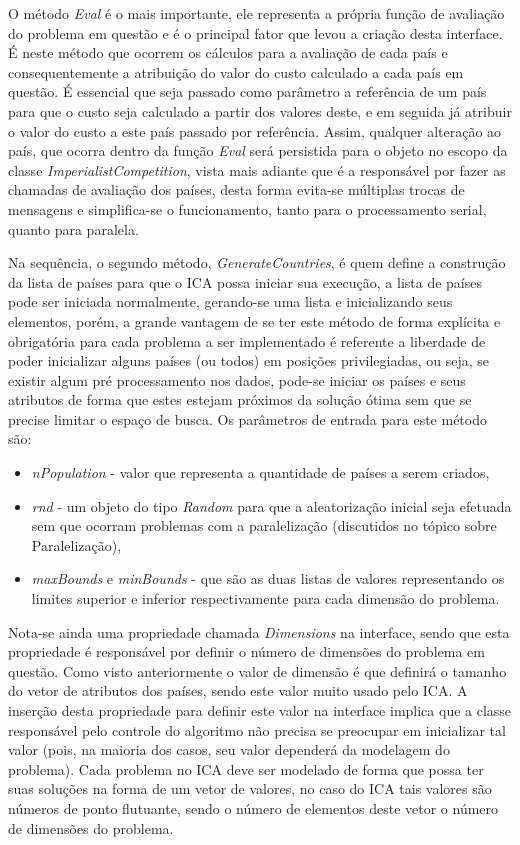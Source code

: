 O método \emph{Eval} é o mais importante, ele representa a própria função de avaliação do problema em questão e é o principal fator que levou a criação desta interface. É neste método que ocorrem os cálculos para a avaliação de cada país e consequentemente a atribuição do valor do custo calculado a cada país em questão. É essencial que seja passado como parâmetro a referência de um país para que o custo seja calculado a partir dos valores deste, e em seguida já atribuir o valor do custo a este país passado por referência. Assim, qualquer alteração ao país, que ocorra dentro da função \emph{Eval} será persistida para o objeto no escopo da classe \emph{ImperialistCompetition}, vista mais adiante que é a responsável por fazer as chamadas de avaliação dos países, desta forma evita-se múltiplas trocas de mensagens e simplifica-se o funcionamento, tanto para o processamento serial, quanto para paralela.
 
Na sequência, o segundo método, \emph{GenerateCountries}, é quem define a construção da lista de países para que o ICA possa iniciar sua execução, a lista de países pode ser iniciada normalmente, gerando-se uma lista e inicializando seus elementos, porém, a grande vantagem de se ter este método de forma explícita e obrigatória para cada problema a ser implementado é referente a liberdade de poder inicializar alguns países (ou todos) em posições privilegiadas, ou seja, se existir algum pré processamento nos dados, pode-se iniciar os países e seus atributos de forma que estes estejam próximos da solução ótima sem que se precise limitar o espaço de busca. Os parâmetros de entrada para este método são:
\begin{itemize}
\item \emph{nPopulation} - valor que representa a quantidade de países a serem criados,
\item \emph{rnd} - um objeto do tipo \emph{Random} para que a aleatorização inicial seja efetuada sem que ocorram problemas com a paralelização (discutidos no tópico sobre Paralelização),
\item \emph{maxBounds} e \emph{minBounds} -  que são as duas listas de valores representando os limites superior e inferior respectivamente para cada dimensão do problema.
\end{itemize}

Nota-se ainda uma propriedade chamada \emph{Dimensions} na interface, sendo que esta propriedade é responsável por definir o número de dimensões do problema em questão. Como visto anteriormente o valor de dimensão é que definirá o tamanho do vetor de atributos dos países, sendo este valor muito usado pelo ICA. A inserção desta propriedade para definir este valor na interface implica que a classe responsável pelo controle do algoritmo não precisa se preocupar em inicializar tal valor (pois, na maioria dos casos, seu valor dependerá da modelagem do problema). Cada problema no ICA deve ser modelado de forma que possa ter suas soluções na forma de um vetor de valores, no caso do ICA tais valores são números de ponto flutuante, sendo o número de elementos deste vetor o número de dimensões do problema.

